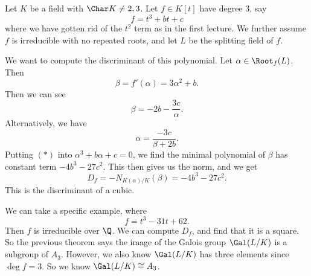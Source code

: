 \documentclass[a4paper]{article}
\begin{document}
\begin{eg}
  Let $K$ be a field with $\Char K \not = 2, 3$. Let $f \in K[t]$ have degree $3$, say
  \[
    f = t^3 + bt + c
  \]
  where we have gotten rid of the $t^2$ term as in the first lecture. We further assume $f$ is irreducible with no repeated roots, and let $L$ be the splitting field of $f$.

  We want to compute the discriminant of this polynomial. Let $\alpha \in \Root_f(L)$. Then
  \[
    \beta = f'(\alpha) = 3 \alpha^2 + b.
  \]
  Then we can see
  \[
    \beta = -2b - \frac{3c}{\alpha}.
  \]
  Alternatively, we have
  \[
    \alpha = \frac{-3c}{\beta + 2b}.\tag{$*$}
  \]
  Putting $(*)$ into $\alpha^3 + b\alpha + c = 0$, we find the minimal polynomial of $\beta$ has constant term $-4 b^3 - 27 c^2$. This then gives us the norm, and we get
  \[
    D_f = -N_{K(\alpha)/K}(\beta) = - 4b^3 - 27c^2.
  \]
  This is the discriminant of a cubic.

  We can take a specific example, where
  \[
    f = t^3 - 31 t + 62.
  \]
  Then $f$ is irreducible over $\Q$. We can compute $D_f$, and find that it is a square. So the previous theorem says the image of the Galois group $\Gal(L/K)$ is a subgroup of $A_3$. However, we also know $\Gal(L/K)$ has three elements since $\deg f = 3$. So we know $\Gal(L/K) \cong A_3$.
\end{eg}
\end{document}
